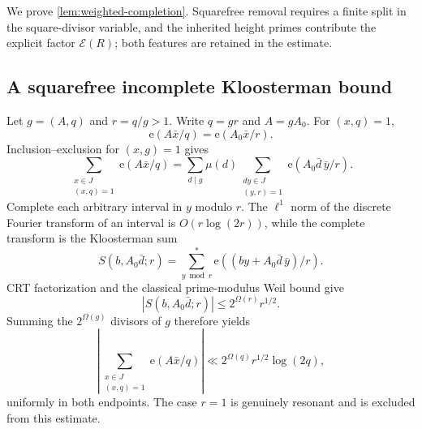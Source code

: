 \documentclass[11pt]{article}
\theoremstyle{definition}
\theoremstyle{remark}
\newcommand{\Ecal}{\mathcal E}
\newcommand{\e}{\mathrm e}
\newcommand{\1}{\mathbf 1}
\newcommand{\Om}{\Omega}
\begin{document}
We prove \cref{lem:weighted-completion}.  Squarefree removal requires a finite split in the square-divisor variable, and the inherited height primes contribute the explicit factor $\Ecal(R)$; both features are retained in the estimate.

\subsection{A squarefree incomplete Kloosterman bound}
Let $g=(A,q)$ and $r=q/g>1$.  Write $q=gr$ and $A=gA_0$.  For $(x,q)=1$,
\[
\e(A\bar x/q)=\e(A_0\bar x/r).
\]
Inclusion--exclusion for $(x,g)=1$ gives
\[
\sum_{\substack{x\in J\\(x,q)=1}}\e(A\bar x/q)
=\sum_{d\mid g}\mu(d)
 \sum_{\substack{dy\in J\\(y,r)=1}}
 \e(A_0\bar d\,\bar y/r).
\]
Complete each arbitrary interval in $y$ modulo $r$.  The $\ell^1$ norm of the discrete Fourier transform of an interval is $O(r\log(2r))$, while the complete transform is the Kloosterman sum
\[
S(b,A_0\bar d;r)
=\sum_{y\bmod r}^{*}\e((by+A_0\bar d\,\bar y)/r).
\]
CRT factorization and the classical prime-modulus Weil bound give
\[
|S(b,A_0\bar d;r)|\le2^{\Om(r)}r^{1/2}.
\]
Summing the $2^{\Om(g)}$ divisors of $g$ therefore yields
\begin{equation}\label{eq:app-incomplete-kl}
\left|\sum_{\substack{x\in J\\(x,q)=1}}\e(A\bar x/q)\right|
\ll2^{\Om(q)}r^{1/2}\log(2q),
\end{equation}
uniformly in both endpoints.  The case $r=1$ is genuinely resonant and is excluded from this estimate.
\end{document}
